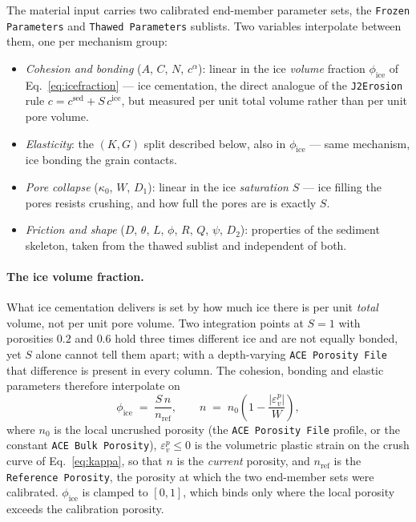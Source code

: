 \documentclass[12pt]{article}
\begin{document}
The material input carries two calibrated end-member parameter sets,
the \texttt{Frozen Parameters} and \texttt{Thawed Parameters}
sublists. Two variables interpolate between them, one per mechanism
group:
\begin{itemize}
\item \emph{Cohesion and bonding} ($A$, $C$, $N$, $c^\alpha$):
  linear in the ice \emph{volume} fraction $\phi_{\mathrm{ice}}$ of
  Eq.~\eqref{eq:icefraction} --- ice cementation, the direct analogue
  of the \texttt{J2Erosion} rule
  $c = c^{\mathrm{sed}} + S\,c^{\mathrm{ice}}$, but measured per unit
  total volume rather than per unit pore volume.
\item \emph{Elasticity}: the $(K, G)$ split described below, also in
  $\phi_{\mathrm{ice}}$ --- same mechanism, ice bonding the grain
  contacts.
\item \emph{Pore collapse} ($\kappa_0$, $W$, $D_1$): linear in the
  ice \emph{saturation} $S$ --- ice filling the pores resists
  crushing, and how full the pores are is exactly $S$.
\item \emph{Friction and shape} ($D$, $\theta$, $L$, $\phi$, $R$,
  $Q$, $\psi$, $D_2$): properties of the sediment skeleton, taken
  from the thawed sublist and independent of both.
\end{itemize}

\paragraph{The ice volume fraction.}
What ice cementation delivers is set by how much ice there is per
unit \emph{total} volume, not per unit pore volume. Two integration
points at $S = 1$ with porosities $0.2$ and $0.6$ hold three times
different ice and are not equally bonded, yet $S$ alone cannot tell
them apart; with a depth-varying \texttt{ACE Porosity File} that
difference is present in every column. The cohesion, bonding and
elastic parameters therefore interpolate on
\begin{equation}
  \phi_{\mathrm{ice}} \;=\; \frac{S\,n}{n_{\mathrm{ref}}},
  \qquad
  n \;=\; n_0 \left( 1 - \frac{|\varepsilon_v^p|}{W} \right),
  \label{eq:icefraction}
\end{equation}
where $n_0$ is the local uncrushed porosity (the \texttt{ACE Porosity
File} profile, or the constant \texttt{ACE Bulk Porosity}),
$\varepsilon_v^p \le 0$ is the volumetric plastic strain on the crush
curve of Eq.~\eqref{eq:kappa}, so that $n$ is the \emph{current}
porosity, and $n_{\mathrm{ref}}$ is the \texttt{Reference Porosity},
the porosity at which the two end-member sets were calibrated.
$\phi_{\mathrm{ice}}$ is clamped to $[0,1]$, which binds only where
the local porosity exceeds the calibration porosity.
\end{document}
